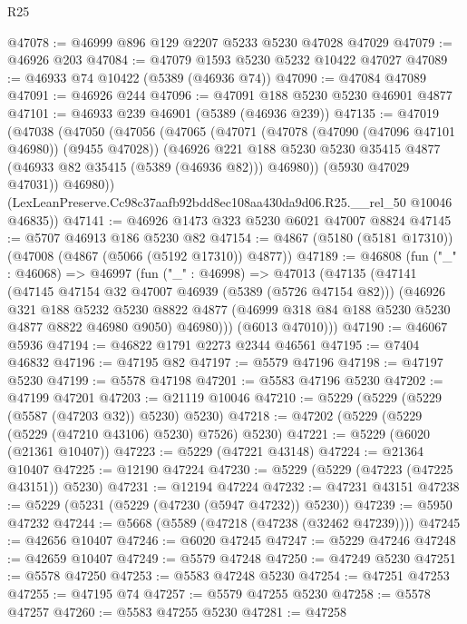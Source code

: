 \begin{lexlean}{R25}
\begin{coremodule}
@47078 := @46999 @896 @129 @2207 @5233 @5230 @47028 @47029
@47079 := @46926 @203
@47084 := @47079 @1593 @5230 @5232 @10422 @47027
@47089 := @46933 @74 @10422 (@5389 (@46936 @74))
@47090 := @47084 @47089
@47091 := @46926 @244
@47096 := @47091 @188 @5230 @5230 @46901 @4877
@47101 := @46933 @239 @46901 (@5389 (@46936 @239))
@47135 := @47019
    (@47038
      (@47050
        (@47056
          (@47065
            (@47071
              (@47078 (@47090 (@47096 @47101 @46980)) (@9455 @47028))
              (@46926
                @221
                @188
                @5230
                @5230
                @35415
                @4877
                (@46933 @82 @35415 (@5389 (@46936 @82)))
                @46980))
            (@5930 @47029 @47031))
          @46980))
      (LexLeanPreserve.Cc98c37aafb92bdd8ec108aa430da9d06.R25.__rel_50 @10046 @46835))
@47141 := @46926 @1473 @323 @5230 @6021 @47007 @8824
@47145 := @5707 @46913 @186 @5230 @82
@47154 := @4867 (@5180 (@5181 @17310)) (@47008 (@4867 (@5066 (@5192 @17310)) @4877))
@47189 := @46808
    (fun ("_" : @46068) =>
    @46997
      (fun ("_" : @46998) =>
      @47013
        (@47135
          (@47141
            (@47145 @47154 @32 @47007 @46939 (@5389 (@5726 @47154 @82)))
            (@46926
              @321
              @188
              @5232
              @5230
              @8822
              @4877
              (@46999 @318 @84 @188 @5230 @5230 @4877 @8822 @46980 @9050)
              @46980)))
        (@6013 @47010)))
@47190 := @46067 @5936
@47194 := @46822 @1791 @2273 @2344 @46561
@47195 := @7404 @46832
@47196 := @47195 @82
@47197 := @5579 @47196
@47198 := @47197 @5230
@47199 := @5578 @47198
@47201 := @5583 @47196 @5230
@47202 := @47199 @47201
@47203 := @21119 @10046
@47210 := @5229 (@5229 (@5229 (@5587 (@47203 @32)) @5230) @5230)
@47218 := @47202 (@5229 (@5229 (@5229 (@47210 @43106) @5230) @7526) @5230)
@47221 := @5229 (@6020 (@21361 @10407))
@47223 := @5229 (@47221 @43148)
@47224 := @21364 @10407
@47225 := @12190 @47224
@47230 := @5229 (@5229 (@47223 (@47225 @43151)) @5230)
@47231 := @12194 @47224
@47232 := @47231 @43151
@47238 := @5229 (@5231 (@5229 (@47230 (@5947 @47232)) @5230))
@47239 := @5950 @47232
@47244 := @5668 (@5589 (@47218 (@47238 (@32462 @47239))))
@47245 := @42656 @10407
@47246 := @6020 @47245
@47247 := @5229 @47246
@47248 := @42659 @10407
@47249 := @5579 @47248
@47250 := @47249 @5230
@47251 := @5578 @47250
@47253 := @5583 @47248 @5230
@47254 := @47251 @47253
@47255 := @47195 @74
@47257 := @5579 @47255 @5230
@47258 := @5578 @47257
@47260 := @5583 @47255 @5230
@47281 := @47258

\end{coremodule}
\end{lexlean}

